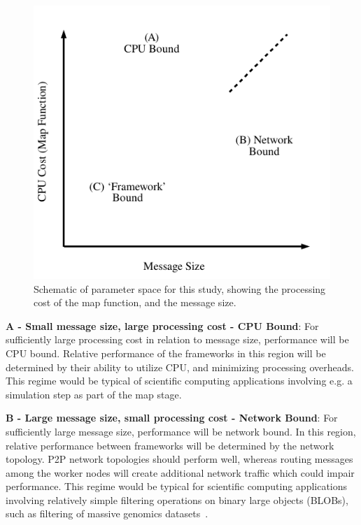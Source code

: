 \documentclass[conference]{IEEEtran}
\begin{document}
\begin{figure}[h]
\begin{center}
\includegraphics[width=0.5\linewidth]{images/prediction}
\end{center}
\caption{Schematic of parameter space for this study, showing the processing cost of the map function, and the message size.}
\label{fig:prediction}
\end{figure}



\textbf{A - Small message size, large processing cost - CPU Bound}: For sufficiently large processing cost in relation to message size, performance will be CPU bound. Relative performance of the frameworks in this region will be determined by their ability to utilize CPU, and minimizing processing overheads. This regime would be typical of scientific computing applications involving e.g. a simulation step as part of the map stage.

\textbf{B - Large message size, small processing cost - Network Bound}: For sufficiently large message size, performance will be network bound. In this region, relative performance between frameworks will be determined by the network topology. P2P network topologies should perform well, whereas routing messages among the worker nodes will create additional network traffic which could impair performance. This regime would be typical for scientific computing applications involving relatively simple filtering operations on binary large objects (BLOBs), such as filtering of massive genomics datasets~\cite{ausmeesBAMSIMulticloudService2018}.
\end{document}
